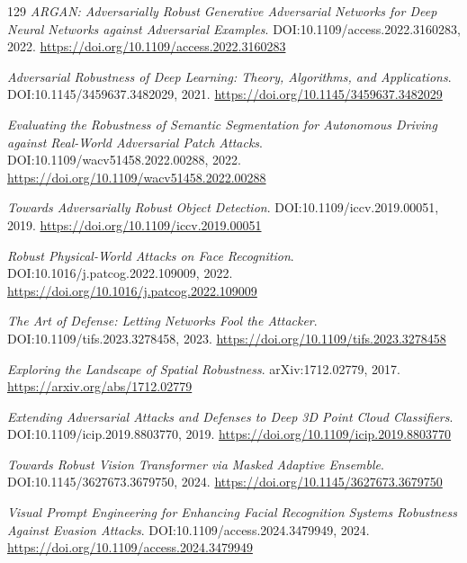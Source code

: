 \documentclass[11pt,a4paper]{article}
\begin{document}
\begin{thebibliography}{129}
\newblock \emph{ARGAN: Adversarially Robust Generative Adversarial Networks for Deep Neural Networks against Adversarial Examples}.
\newblock DOI:10.1109/access.2022.3160283, 2022.
\newblock \url{https://doi.org/10.1109/access.2022.3160283}

\newblock \emph{Adversarial Robustness of Deep Learning: Theory, Algorithms, and Applications}.
\newblock DOI:10.1145/3459637.3482029, 2021.
\newblock \url{https://doi.org/10.1145/3459637.3482029}

\newblock \emph{Evaluating the Robustness of Semantic Segmentation for Autonomous Driving against Real-World Adversarial Patch Attacks}.
\newblock DOI:10.1109/wacv51458.2022.00288, 2022.
\newblock \url{https://doi.org/10.1109/wacv51458.2022.00288}

\newblock \emph{Towards Adversarially Robust Object Detection}.
\newblock DOI:10.1109/iccv.2019.00051, 2019.
\newblock \url{https://doi.org/10.1109/iccv.2019.00051}

\newblock \emph{Robust Physical-World Attacks on Face Recognition}.
\newblock DOI:10.1016/j.patcog.2022.109009, 2022.
\newblock \url{https://doi.org/10.1016/j.patcog.2022.109009}

\newblock \emph{The Art of Defense: Letting Networks Fool the Attacker}.
\newblock DOI:10.1109/tifs.2023.3278458, 2023.
\newblock \url{https://doi.org/10.1109/tifs.2023.3278458}

\newblock \emph{Exploring the Landscape of Spatial Robustness}.
\newblock arXiv:1712.02779, 2017.
\newblock \url{https://arxiv.org/abs/1712.02779}

\newblock \emph{Extending Adversarial Attacks and Defenses to Deep 3D Point Cloud Classifiers}.
\newblock DOI:10.1109/icip.2019.8803770, 2019.
\newblock \url{https://doi.org/10.1109/icip.2019.8803770}

\newblock \emph{Towards Robust Vision Transformer via Masked Adaptive Ensemble}.
\newblock DOI:10.1145/3627673.3679750, 2024.
\newblock \url{https://doi.org/10.1145/3627673.3679750}

\newblock \emph{Visual Prompt Engineering for Enhancing Facial Recognition Systems Robustness Against Evasion Attacks}.
\newblock DOI:10.1109/access.2024.3479949, 2024.
\newblock \url{https://doi.org/10.1109/access.2024.3479949}


\end{thebibliography}
\end{document}
